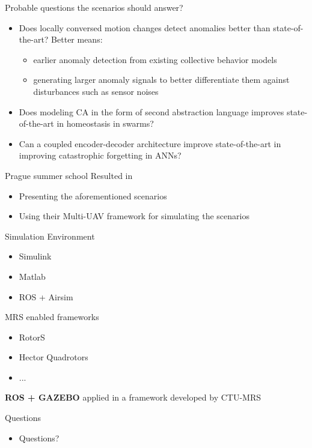 \documentclass[unknownkeysallowed]{beamer}
\begin{document}
	\begin{frame}{Probable questions the scenarios should answer?}
		\begin{itemize}
			\item Does locally conversed motion changes detect anomalies better than state-of-the-art? Better means:
			\begin{itemize}
				\item earlier anomaly detection from existing collective behavior models
				\item generating larger anomaly signals to better differentiate them against disturbances such as sensor noises
			\end{itemize}
			\item Does modeling CA in the form of second abstraction language improves state-of-the-art in   homeostasis in swarms?
			\item Can a coupled encoder-decoder architecture improve state-of-the-art in improving catastrophic forgetting in ANNs? 
		\end{itemize}
	\end{frame}

	\begin{frame}{Prague summer school}
		Resulted in
		\begin{itemize}
			\item Presenting the aforementioned scenarios
			\item Using their Multi-UAV framework for simulating the scenarios
		\end{itemize}
	\end{frame}

	\begin{frame}{Simulation Environment}
		\begin{itemize}
			\item Simulink
			\item Matlab
			\item ROS + Airsim
		\end{itemize}
		MRS enabled frameworks
		\begin{itemize}
			\item RotorS
			\item Hector Quadrotors 
			\item ...
		\end{itemize}
		\textbf{ROS + GAZEBO} applied in a framework developed by CTU-MRS
	\end{frame}

	\begin{frame}{Questions}
		\begin{itemize}
			\item Questions?
		\end{itemize}
	\end{frame}
\end{document}
